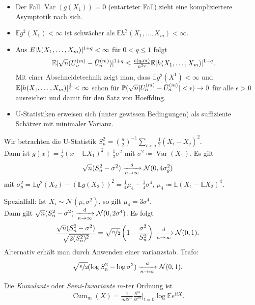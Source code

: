 \documentclass{cheat-sheet}
\renewcommand{\P}{\mathbb{P}} %
\newcommand{\E}{\mathbb{E}} %
\DeclareMathOperator{\Cum}{Cum} %
\DeclareMathOperator{\var}{Var} %
\newcommand{\Normal}{\mathcal{N}} %
\begin{document}
\begin{bemn}
  \begin{itemize}
    \item Der Fall $\var(g(X_1)) = 0$ (entarteter Fall) zieht eine kompliziertere Asymptotik nach sich. %
    \item $\E g^2(X_1) < \infty$ ist schwächer als $\E h^2(X_1, \ldots, X_m) < \infty$.
    \item Aus $E \lvert h(X_1, \ldots, X_m)\rvert^{1+q} < \infty$ für $0 < q \leq 1$ folgt %
    \[
      \E \abs{\sqrt{n} (U_n^{(m)} - \tilde{U}_n^{(m)})}^{1+q} \leq \tfrac{c(q, m)}{n^{2q}} \E \abs{h(X_1, \ldots, X_m)}^{1+q}.
    \]
    Mit einer Abschneidetechnik zeigt man, dass $\E g^2(X^1) < \infty$ und $\E \abs{h(X_1, \ldots, X_m)}^{\frac{4}{3}} < \infty$ schon für $\P(\sqrt{n} \abs{U_n^{(m)} - \tilde{U}_n^{(m)}} < \epsilon) \to 0$ für alle $\epsilon > 0$ ausreichen und damit für den Satz von Hoeffding.
    \item U-Statistiken erweisen sich (unter gewissen Bedingungen) als suffiziente Schätzer mit minimaler Varianz.
  \end{itemize}
\end{bemn}

\begin{bsp}
  Wir betrachten die U-Statistik $S_n^2 = \binom{n}{2}^{-1} \sum_{i < j} \tfrac{1}{2} (X_i - X_j)^2$. \\
  Dann ist $g(x) = \tfrac{1}{2} (x - \E X_1)^2 + \tfrac{1}{2} \sigma^2$ mit $\sigma^2 \coloneqq \var(X_1)$.
  Es gilt
  \[ \sqrt{n} (S_n^2 - \sigma^2) \xra[n \to \infty]{d} \Normal(0, 4 \sigma_g^2) \]
  mit $\sigma_g^2 = \E g^2(X_2) - (\E g(X_2))^2 = \tfrac{1}{4} \mu_4 - \tfrac{1}{4} \sigma^4$, $\mu_4 \coloneqq \E (X_1 - \E X_2)^4$.
  
  Spezialfall: Ist $X_i \sim \Normal(\mu, \sigma^2)$, so gilt $\mu_4 = 3 \sigma^4$. \\
  Dann gilt $\sqrt{n} (S_n^2 - \sigma^2) \xra[n \to \infty]{d} \Normal(0, 2 \sigma^4)$.
  Es folgt
  \[ \frac{ \sqrt{n} (S_n^2 - \sigma^2) }{\sqrt{2 (S_n^2)^2}} = \sqrt{\nicefrac{n}{2}} \left( 1 - \frac{\sigma^2}{S_n^2} \right) \xra[n \to \infty]{d} \Normal(0, 1). \]
  Alternativ erhält man durch Anwenden einer varianzstab. Trafo:
  \[
    \sqrt{\nicefrac{n}{2}} (\log S_n^2 - \log \sigma^2) \xra[n \to \infty]{d} \Normal(0, 1).
  \]
\end{bsp}


\begin{defn}
  Die \emph{Kumulante} oder \emph{Semi-Invariante} $m$-ter Ordnung ist
  \[ \Cum_m(X) = \tfrac{1}{m! 2^m} \tfrac{\partial^m}{\partial t^m}|_{t=0} \log \E e^{it X}. \]
\end{defn}
\end{document}
